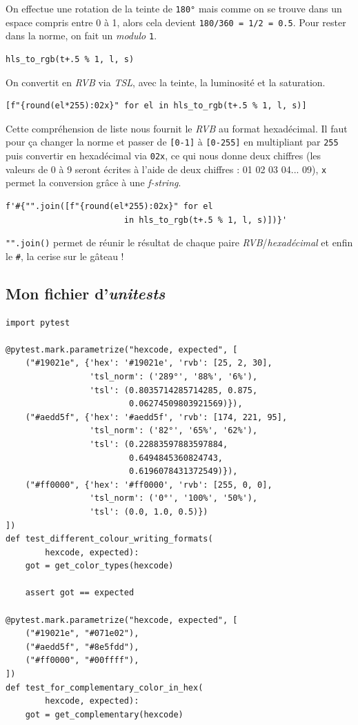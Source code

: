 On effectue une rotation de la teinte de \texttt{180°} mais comme on se trouve dans un espace compris entre 0 à 1, alors cela devient \texttt{180/360 = 1/2 = 0.5}. Pour rester dans la norme, on fait un \textit{modulo} \texttt{1}.
\medskip

\begin{verbatim}
hls_to_rgb(t+.5 % 1, l, s)
\end{verbatim}
\medskip

On convertit en \textit{RVB} via \textit{TSL}, avec la teinte, la luminosité et la saturation.
\medskip

\begin{verbatim}
[f"{round(el*255):02x}" for el in hls_to_rgb(t+.5 % 1, l, s)]
\end{verbatim}
\medskip

Cette compréhension de liste nous fournit le \textit{RVB} au format hexadécimal. Il faut pour ça changer la norme et passer de \texttt{[0-1]} à \texttt{[0-255]} en multipliant par \texttt{255} puis convertir en hexadécimal via \texttt{02x}, ce qui nous donne deux chiffres (les valeurs de 0 à 9 seront écrites à l'aide de deux chiffres : 01 02 03 04... 09), \texttt{x} permet la conversion grâce à une \textit{f-string}.
\medskip

\begin{verbatim}
f'#{"".join([f"{round(el*255):02x}" for el 
                        in hls_to_rgb(t+.5 % 1, l, s)])}'
\end{verbatim}
\medskip

\texttt{"".join()} permet de réunir le résultat de chaque paire \textit{RVB}/\textit{hexadécimal} et enfin le \og \texttt{\#}\fg{}, la cerise sur le gâteau !
\medskip

\subsection*{Mon fichier d'\textit{unitests}}
\begin{lstlisting}
import pytest

@pytest.mark.parametrize("hexcode, expected", [
    ("#19021e", {'hex': '#19021e', 'rvb': [25, 2, 30],
                 'tsl_norm': ('289°', '88%', '6%'),
                 'tsl': (0.8035714285714285, 0.875,
                         0.06274509803921569)}),
    ("#aedd5f", {'hex': '#aedd5f', 'rvb': [174, 221, 95],
                 'tsl_norm': ('82°', '65%', '62%'),
                 'tsl': (0.22883597883597884,
                         0.6494845360824743,
                         0.6196078431372549)}),
    ("#ff0000", {'hex': '#ff0000', 'rvb': [255, 0, 0],
                 'tsl_norm': ('0°', '100%', '50%'),
                 'tsl': (0.0, 1.0, 0.5)})
])
def test_different_colour_writing_formats(
        hexcode, expected):
    got = get_color_types(hexcode)

    assert got == expected

@pytest.mark.parametrize("hexcode, expected", [
    ("#19021e", "#071e02"),
    ("#aedd5f", "#8e5fdd"),
    ("#ff0000", "#00ffff"),
])
def test_for_complementary_color_in_hex(
        hexcode, expected):
    got = get_complementary(hexcode)
\end{lstlisting}
\medskip

